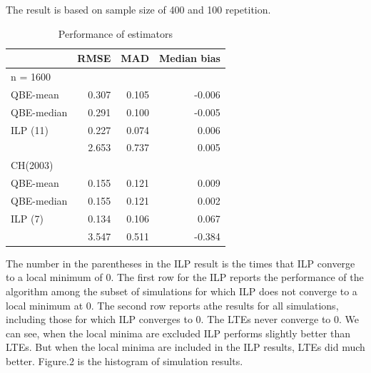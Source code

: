 \documentclass[12pt]{article}
\theoremstyle{plain} \newtheorem{theorem}{Theorem}
\theoremstyle{definition} \newtheorem{definition}{Definition}
\begin{document}
The result is based on sample size of 400 and 100 repetition.

\begin{table}[h]
    \centering
    \begin{tabular}{lrrr}
      \hline
      & RMSE   & MAD  & Median bias \\ \hline
      n = 1600   &       &       &  \\
      QBE-mean   & 0.307 & 0.105 & -0.006     \\
      QBE-median & 0.291 & 0.100 & -0.005    \\
      ILP (11)   & 0.227 & 0.074 &  0.006    \\
      & 2.653 & 0.737 &  0.005    \\
      \hline
      CH(2003)   &       &       &  \\
      QBE-mean   & 0.155 & 0.121 &  0.009    \\
      QBE-median & 0.155 & 0.121 &  0.002    \\
      ILP (7)    & 0.134 & 0.106 &  0.067    \\
      & 3.547 & 0.511 & -0.384    \\
      \hline
    \end{tabular}
    \caption{Performance of estimators}
\end{table}

The number in the parentheses in the ILP result is the times that ILP
converge to a local minimum of 0. The first row for the ILP reports
the performance of the algorithm among the subset of simulations for
which ILP does not converge to a local minimum at 0. The second row
reports athe results for all simulations, including those for which ILP
converges to 0. The LTEs never converge to 0. We can see, when the
local minima are excluded ILP performs slightly better than LTEs. But
when the local minima are included in the ILP results, LTEs did much
better. Figure.2 is the histogram of simulation results.
\end{document}
